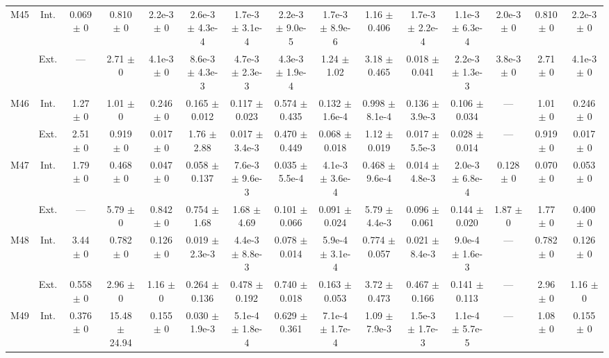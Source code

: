 \begin{table}[htbp]
{\begin{tabular}{@{}ccccccccccccccc@{}}
\cline{2-15}
\multirow{2}{*}{M45} & Int. & 0.069 $\pm$ 0 & 0.810 $\pm$ 0 & 2.2e-3 $\pm$ 0 & 2.6e-3 $\pm$ 4.3e-4 & 1.7e-3 $\pm$ 3.1e-4 & 2.2e-3 $\pm$ 9.0e-5 & 1.7e-3 $\pm$ 8.9e-6 & 1.16 $\pm$ 0.406 & 1.7e-3 $\pm$ 2.2e-4 & 1.1e-3 $\pm$ 6.3e-4 & 2.0e-3 $\pm$ 0 & 0.810 $\pm$ 0 & 2.2e-3 $\pm$ 0 \\
 & Ext. & --- & 2.71 $\pm$ 0 & 4.1e-3 $\pm$ 0 & 8.6e-3 $\pm$ 4.3e-3 & 4.7e-3 $\pm$ 2.3e-3 & 4.3e-3 $\pm$ 1.9e-4 & 1.24 $\pm$ 1.02 & 3.18 $\pm$ 0.465 & 0.018 $\pm$ 0.041 & 2.2e-3 $\pm$ 1.3e-3 & 3.8e-3 $\pm$ 0 & 2.71 $\pm$ 0 & 4.1e-3 $\pm$ 0 \\
\cline{2-15}
\multirow{2}{*}{M46} & Int. & 1.27 $\pm$ 0 & 1.01 $\pm$ 0 & 0.246 $\pm$ 0 & 0.165 $\pm$ 0.012 & 0.117 $\pm$ 0.023 & 0.574 $\pm$ 0.435 & 0.132 $\pm$ 1.6e-4 & 0.998 $\pm$ 8.1e-4 & 0.136 $\pm$ 3.9e-3 & 0.106 $\pm$ 0.034 & --- & 1.01 $\pm$ 0 & 0.246 $\pm$ 0 \\
 & Ext. & 2.51 $\pm$ 0 & 0.919 $\pm$ 0 & 0.017 $\pm$ 0 & 1.76 $\pm$ 2.88 & 0.017 $\pm$ 3.4e-3 & 0.470 $\pm$ 0.449 & 0.068 $\pm$ 0.018 & 1.12 $\pm$ 0.019 & 0.017 $\pm$ 5.5e-3 & 0.028 $\pm$ 0.014 & --- & 0.919 $\pm$ 0 & 0.017 $\pm$ 0 \\
\cline{2-15}
\multirow{2}{*}{M47} & Int. & 1.79 $\pm$ 0 & 0.468 $\pm$ 0 & 0.047 $\pm$ 0 & 0.058 $\pm$ 0.137 & 7.6e-3 $\pm$ 9.6e-3 & 0.035 $\pm$ 5.5e-4 & 4.1e-3 $\pm$ 3.6e-4 & 0.468 $\pm$ 9.6e-4 & 0.014 $\pm$ 4.8e-3 & 2.0e-3 $\pm$ 6.8e-4 & 0.128 $\pm$ 0 & 0.070 $\pm$ 0 & 0.053 $\pm$ 0 \\
 & Ext. & --- & 5.79 $\pm$ 0 & 0.842 $\pm$ 0 & 0.754 $\pm$ 1.68 & 1.68 $\pm$ 4.69 & 0.101 $\pm$ 0.066 & 0.091 $\pm$ 0.024 & 5.79 $\pm$ 4.4e-3 & 0.096 $\pm$ 0.061 & 0.144 $\pm$ 0.020 & 1.87 $\pm$ 0 & 1.77 $\pm$ 0 & 0.400 $\pm$ 0 \\
\cline{2-15}
\multirow{2}{*}{M48} & Int. & 3.44 $\pm$ 0 & 0.782 $\pm$ 0 & 0.126 $\pm$ 0 & 0.019 $\pm$ 2.3e-3 & 4.4e-3 $\pm$ 8.8e-3 & 0.078 $\pm$ 0.014 & 5.9e-4 $\pm$ 3.1e-4 & 0.774 $\pm$ 0.057 & 0.021 $\pm$ 8.4e-3 & 9.0e-4 $\pm$ 1.6e-3 & --- & 0.782 $\pm$ 0 & 0.126 $\pm$ 0 \\
 & Ext. & 0.558 $\pm$ 0 & 2.96 $\pm$ 0 & 1.16 $\pm$ 0 & 0.264 $\pm$ 0.136 & 0.478 $\pm$ 0.192 & 0.740 $\pm$ 0.018 & 0.163 $\pm$ 0.053 & 3.72 $\pm$ 0.473 & 0.467 $\pm$ 0.166 & 0.141 $\pm$ 0.113 & --- & 2.96 $\pm$ 0 & 1.16 $\pm$ 0 \\
\cline{2-15}
\multirow{2}{*}{M49} & Int. & 0.376 $\pm$ 0 & 15.48 $\pm$ 24.94 & 0.155 $\pm$ 0 & 0.030 $\pm$ 1.9e-3 & 5.1e-4 $\pm$ 1.8e-4 & 0.629 $\pm$ 0.361 & 7.1e-4 $\pm$ 1.7e-4 & 1.09 $\pm$ 7.9e-3 & 1.5e-3 $\pm$ 1.7e-3 & 1.1e-4 $\pm$ 5.7e-5 & --- & 1.08 $\pm$ 0 & 0.155 $\pm$ 0 \\

\end{tabular}}
\end{table}
